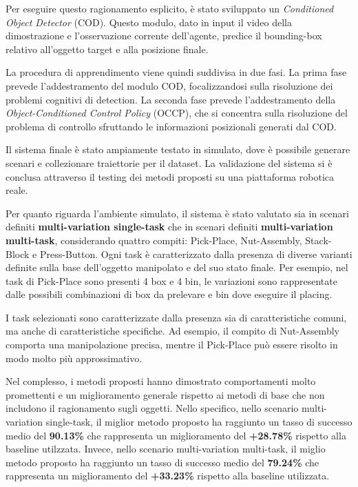 Per eseguire questo ragionamento esplicito, è stato sviluppato un \textit{Conditioned Object Detector} (COD). Questo modulo, dato in input il video della dimostrazione e l'osservazione corrente dell'agente, predice il bounding-box relativo all'oggetto target e alla posizione finale.

La procedura di apprendimento viene quindi suddivisa in due fasi. La prima fase prevede l'addestramento del modulo COD, focalizzandosi sulla risoluzione dei problemi cognitivi di detection. La seconda fase prevede l'addestramento della \textit{Object-Conditioned Control Policy} (OCCP), che si concentra sulla risoluzione del problema di controllo sfruttando le informazioni posizionali generati dal COD.

Il sistema finale è stato ampiamente testato in simulato, dove è possibile generare scenari e collezionare traiettorie per il dataset. La validazione del sistema si è conclusa attraverso il testing dei metodi proposti su una piattaforma robotica reale. 

Per quanto riguarda l'ambiente simulato, il sistema è stato valutato sia in scenari definiti \textbf{multi-variation single-task} che in scenari definiti \textbf{multi-variation multi-task}, considerando quattro compiti: Pick-Place, Nut-Assembly, Stack-Block e Press-Button. Ogni task è caratterizzato dalla presenza di diverse varianti definite sulla base dell'oggetto manipolato e del suo stato finale. Per esempio, nel task di Pick-Place sono presenti 4 box e 4 bin, le variazioni sono rappresentate dalle possibili combinazioni di box da prelevare e bin dove eseguire il placing. 

I task selezionati sono caratterizzate dalla presenza sia di caratteristiche comuni, ma anche di caratteristiche specifiche. Ad esempio, il compito di Nut-Assembly comporta una manipolazione precisa, mentre il Pick-Place può essere risolto in modo molto più approssimativo.

Nel complesso, i metodi proposti hanno dimostrato comportamenti molto promettenti e un miglioramento generale rispetto ai metodi di base che non includono il ragionamento sugli oggetti. Nello specifico, nello scenario multi-variation single-task, il miglior metodo proposto ha raggiunto un tasso di successo medio del \textbf{90.13\%} che rappresenta un miglioramento del \textbf{+28.78\%} rispetto alla baseline utilzzata. Invece, nello scenario multi-variation multi-task, il miglio metodo proposto ha raggiunto un tasso di successo medio del \textbf{79.24\%} che rappresenta un miglioramento del \textbf{+33.23\%} rispetto alla baseline utilizzata. 

